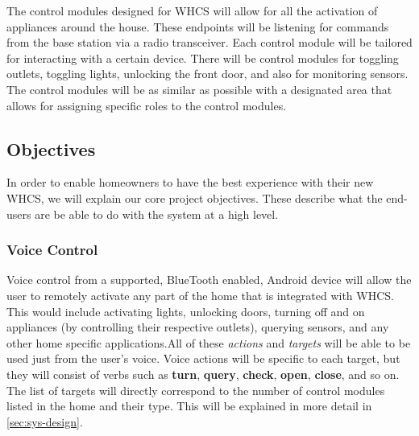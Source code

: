 The control modules designed for WHCS will allow for all the activation of
appliances around the house. These endpoints will be listening for commands
from the base station via a radio transceiver. Each control module will be
tailored for interacting with a certain device. There will be control modules
for toggling outlets, toggling lights, unlocking the front door, and also for
monitoring sensors. The control modules will be as similar as possible with a
designated area that allows for assigning specific roles to the control
modules.


\subsection{Objectives}
In order to enable homeowners to have the best experience with their new WHCS,
we will explain our core project objectives. These describe what the end-users
are be able to do with the system at a high level.

\subsubsection{Voice Control}
Voice control from a supported, BlueTooth enabled, Android device will allow
the user to remotely activate any part of the home that is integrated with
WHCS. This would include activating lights, unlocking doors, turning off and on
appliances (by controlling their respective outlets), querying sensors, and any
other home specific applications.\footnotemark All of these \emph{actions} and
\emph{targets} will be able to be used just from the user's voice. Voice
actions will be specific to each target, but they will consist of verbs such as
\textbf{turn}, \textbf{query}, \textbf{check}, \textbf{open}, \textbf{close},
and so on. The list of targets will directly correspond to the number of
control modules listed in the home and their type.  This will be explained in
more detail in \autoref{sec:sys-design}.


